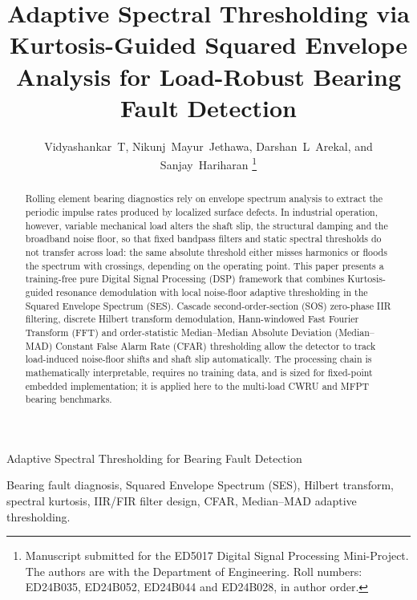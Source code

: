 \documentclass[journal]{IEEEtran}
\begin{document}
\title{Adaptive Spectral Thresholding via Kurtosis-Guided Squared Envelope
Analysis for Load-Robust Bearing Fault Detection}

\author{Vidyashankar~T, Nikunj~Mayur~Jethawa, Darshan~L~Arekal, and
Sanjay~Hariharan%
\thanks{Manuscript submitted for the ED5017 Digital Signal Processing
Mini-Project. The authors are with the Department of Engineering. Roll
numbers: ED24B035, ED24B052, ED24B044 and ED24B028, in author order.}}

%
{Adaptive Spectral Thresholding for Bearing Fault Detection}

\maketitle

\begin{abstract}
Rolling element bearing diagnostics rely on envelope spectrum analysis to
extract the periodic impulse rates produced by localized surface defects.
In industrial operation, however, variable mechanical load alters the shaft
slip, the structural damping and the broadband noise floor, so that fixed
bandpass filters and static spectral thresholds do not transfer across load:
the same absolute threshold either misses harmonics or floods the spectrum
with crossings, depending on the operating point. This paper
presents a training-free pure Digital Signal Processing (DSP) framework that
combines Kurtosis-guided resonance demodulation with local noise-floor
adaptive thresholding in the Squared Envelope Spectrum (SES). Cascade
second-order-section (SOS) zero-phase IIR filtering, discrete Hilbert
transform demodulation, Hann-windowed Fast Fourier Transform (FFT) and
order-statistic Median--Median Absolute Deviation (Median--MAD) Constant
False Alarm Rate (CFAR) thresholding allow the detector to track load-induced
noise-floor shifts and shaft slip automatically. The processing chain is
mathematically interpretable, requires no training data, and is sized for
fixed-point embedded implementation; it is applied here to the multi-load
CWRU and MFPT bearing benchmarks.
\end{abstract}

\begin{IEEEkeywords}
Bearing fault diagnosis, Squared Envelope Spectrum (SES), Hilbert transform,
spectral kurtosis, IIR/FIR filter design, CFAR, Median--MAD adaptive
thresholding.
\end{IEEEkeywords}
\end{document}
